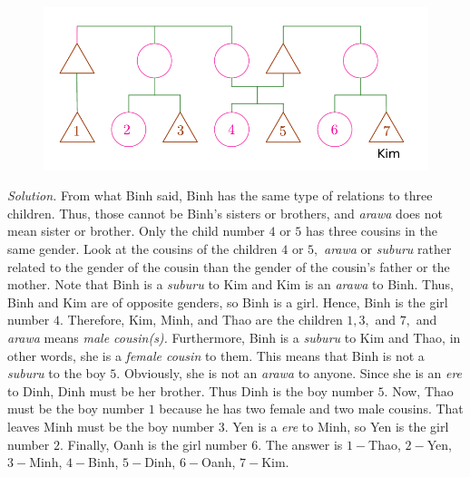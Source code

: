 \begin{multicols}{2}
	\begin{figure}[H]
		\vspace*{-5pt}
		\centering
		\captionsetup{labelformat= empty, justification=centering}
		\includegraphics[width= 1\linewidth]{hc-2022-2-3-15-2.pdf}
		\vspace*{-10pt}
	\end{figure}
	\textit{Solution.} From what Binh said, Binh has the same type of relations to three children.
		Thus, those cannot be Binh's sisters or brothers,
		and \textit{arawa} does not mean sister or brother.
		Only the child number $4$ or $5$ has three cousins in the same gender.
		\vskip 0.1cm
		Look at the cousins of the children $4$ or $5,$
		\textit{arawa} or \textit{suburu} rather related to the gender of the cousin
		than the gender of the cousin's father or the mother.
		Note that Binh is a \textit{suburu} to Kim and Kim is an \textit{arawa} to Binh.
		Thus, Binh and Kim are of opposite genders, so Binh is a girl.
		Hence, Binh is the girl number $4.$
		\vskip 0.1cm
		Therefore, Kim, Minh, and Thao are the children $1, 3,$ and $7,$
		and \textit{arawa} means \textit{male cousin(s).}
		Furthermore, Binh is a \textit{suburu} to Kim and Thao,
		in other words, she is a \textit{female cousin} to them.
		\vskip 0.1cm
		This means that Binh is not a \textit{suburu} to the boy $5.$
		Obviously, she is not an \textit{arawa} to anyone.
		Since she is an \textit{ere} to Dinh, Dinh must be her brother.
		Thus Dinh is the boy number $5.$
		\vskip 0.1cm
		Now, Thao must be the boy number $1$ because he has two female and two male cousins.
		That leaves Minh must be the boy number $3.$
		\vskip 0.1cm
		Yen is a \textit{ere} to Minh, so Yen is the girl number $2.$
		Finally, Oanh is the girl number $6.$
		\vskip 0.1cm
		The answer is $1-$Thao, $2-$Yen, $3-$Minh, $4-$Binh, $5-$Dinh, $6-$Oanh, $7-$Kim.  
\end{multicols}